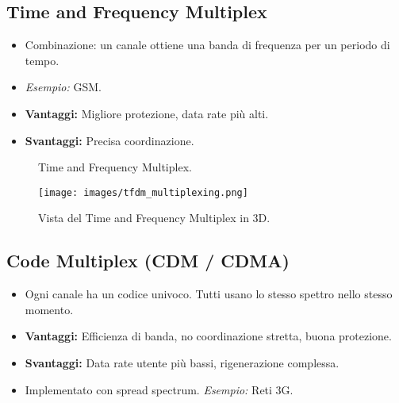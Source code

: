 \subsection{Time and Frequency Multiplex}
\begin{itemize}
    \item Combinazione: un canale ottiene una banda di frequenza per un periodo di tempo.
    \item \textit{Esempio:} GSM.
    \item \textbf{Vantaggi:} Migliore protezione, data rate più alti.
    \item \textbf{Svantaggi:} Precisa coordinazione.
\end{itemize}
\begin{figure}[H]
    \centering
    \caption{Time and Frequency Multiplex.}
    \label{fig:tdm_fdm}
\end{figure}
\begin{figure}[H]
    \centering
    \texttt{[image: images/tfdm\_multiplexing.png]}
    \caption{Vista del Time and Frequency Multiplex in 3D.}
    \label{fig:tfdm_3d}
\end{figure}


\subsection{Code Multiplex (CDM / CDMA)}
\begin{itemize}
    \item Ogni canale ha un codice univoco. Tutti usano lo stesso spettro nello stesso momento.
    \item \textbf{Vantaggi:} Efficienza di banda, no coordinazione stretta, buona protezione.
    \item \textbf{Svantaggi:} Data rate utente più bassi, rigenerazione complessa.
    \item Implementato con spread spectrum. \textit{Esempio:} Reti 3G.
\end{itemize}

